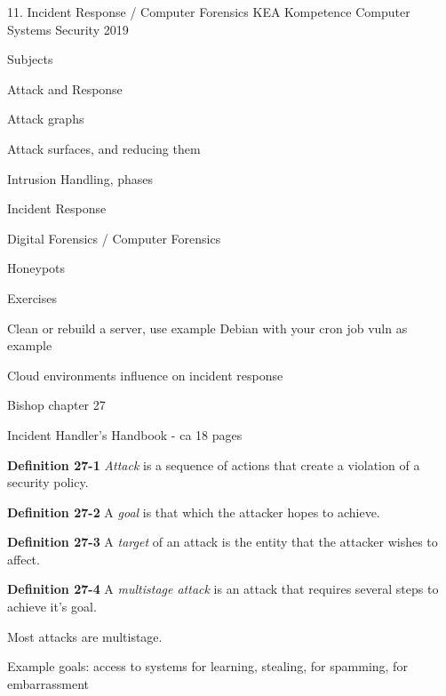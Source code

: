 \documentclass[Screen16to9,17pt]{foils}
\begin{document}
\mytitlepage
{11. Incident Response / Computer Forensics}
{KEA Kompetence Computer Systems Security 2019}



\begin{list1}
\item Subjects
\begin{list2}
\item Attack and Response
\item Attack graphs
\item Attack surfaces, and reducing them
\item Intrusion Handling, phases
\item Incident Response
\item Digital Forensics / Computer Forensics
\item Honeypots
\end{list2}
\item Exercises
\begin{list2}
\item Clean or rebuild a server, use example Debian with your cron job vuln as example

\item Cloud environments influence on incident response
\end{list2}
\end{list1}




\begin{list1}
\item Bishop chapter 27
\item Incident Handler's Handbook - ca 18 pages
\end{list1}



\begin{list1}
\item {\bf Definition 27-1} \emph{Attack} is a sequence of actions that create a violation of a security policy.
\item {\bf Definition 27-2} A \emph{goal} is that which the attacker hopes to achieve.
\item {\bf Definition 27-3} A \emph{target} of an attack is the entity that the attacker wishes to affect.
\item {\bf Definition 27-4} A \emph{multistage attack} is an attack that requires several steps to achieve it's goal.
\item Most attacks are multistage.
\item Example goals: access to systems for learning, stealing,  for spamming, for embarrassment
\end{list1}
\end{document}

